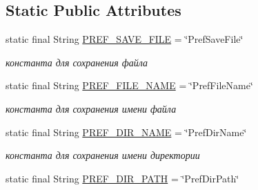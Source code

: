 \subsection*{Static Public Attributes}
\begin{DoxyCompactItemize}
\item 
\mbox{\label{classcom_1_1aykuttasil_1_1callrecord_1_1_call_record_a4199078f7f57ac7c0580f27cda014e41}} 
static final String \hyperlink{classcom_1_1aykuttasil_1_1callrecord_1_1_call_record_a4199078f7f57ac7c0580f27cda014e41}{P\+R\+E\+F\+\_\+\+S\+A\+V\+E\+\_\+\+F\+I\+LE} = \char`\"{}Pref\+Save\+File\char`\"{}
\begin{DoxyCompactList}\small\item\em константа для сохранения файла \end{DoxyCompactList}\item 
\mbox{\label{classcom_1_1aykuttasil_1_1callrecord_1_1_call_record_ab4600912a0eaf76f06353f3b40a81746}} 
static final String \hyperlink{classcom_1_1aykuttasil_1_1callrecord_1_1_call_record_ab4600912a0eaf76f06353f3b40a81746}{P\+R\+E\+F\+\_\+\+F\+I\+L\+E\+\_\+\+N\+A\+ME} = \char`\"{}Pref\+File\+Name\char`\"{}
\begin{DoxyCompactList}\small\item\em константа для сохранения имени файла \end{DoxyCompactList}\item 
\mbox{\label{classcom_1_1aykuttasil_1_1callrecord_1_1_call_record_a625b7daac21b3dc9dda745cf21a447cb}} 
static final String \hyperlink{classcom_1_1aykuttasil_1_1callrecord_1_1_call_record_a625b7daac21b3dc9dda745cf21a447cb}{P\+R\+E\+F\+\_\+\+D\+I\+R\+\_\+\+N\+A\+ME} = \char`\"{}Pref\+Dir\+Name\char`\"{}
\begin{DoxyCompactList}\small\item\em константа для сохранения имени директории \end{DoxyCompactList}\item 
\mbox{\label{classcom_1_1aykuttasil_1_1callrecord_1_1_call_record_a68e254b4a0603e6531c297bde62faddb}} 
static final String \hyperlink{classcom_1_1aykuttasil_1_1callrecord_1_1_call_record_a68e254b4a0603e6531c297bde62faddb}{P\+R\+E\+F\+\_\+\+D\+I\+R\+\_\+\+P\+A\+TH} = \char`\"{}Pref\+Dir\+Path\char`\"{}

\end{DoxyCompactItemize}
